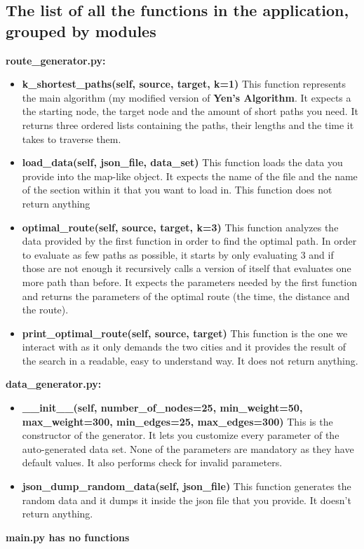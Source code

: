 \documentclass[12pt]{article}
\begin{document}
\subsection{The list of all the functions in the application, grouped by modules}
\textbf{route\_generator.py:}
\begin{itemize}
    \item \textbf{k\_shortest\_paths(self, source, target, k=1)}
    \newline
    This function represents the main algorithm (my modified version of \textbf{Yen's Algorithm}. It expects a the starting node, the target node and the amount of short paths you need. It returns three ordered lists containing the paths, their lengths and the time it takes to traverse them.
    \item \textbf{load\_data(self, json\_file, data\_set)}
    \newline
    This function loads the data you provide into the map-like object. It expects the name of the file and the name of the section within it that you want to load in. This function does not return anything
    \item \textbf{optimal\_route(self, source, target, k=3)}
    \newline
    This function analyzes the data provided by the first function in order to find the optimal path. In order to evaluate as few paths as possible, it starts by only evaluating 3 and if those are not enough it recursively calls a version of itself that evaluates one more path than before. It expects the parameters needed by the first function and returns the parameters of the optimal route (the time, the distance and the route).
    \item \textbf{print\_optimal\_route(self, source, target)}
    \newline
    This function is the one we interact with as it only demands the two cities and it provides the result of the search in a readable, easy to understand way. It does not return anything.
\end{itemize}
\textbf{data\_generator.py:}
\begin{itemize}
    \item \textbf{\_\_init\_\_(self, number\_of\_nodes=25, min\_weight=50, max\_weight=300, min\_edges=25, max\_edges=300)}
    \newline
    This is the constructor of the generator. It lets you customize every parameter of the auto-generated data set. None of the parameters are mandatory as they have default values. It also performs check for invalid parameters.
    \item \textbf{json\_dump\_random\_data(self, json\_file)}
    \newline
    This function generates the random data and it dumps it inside the json file that you provide. It doesn't return anything.
    
\end{itemize}
\textbf{main.py has no functions}
\end{document}
